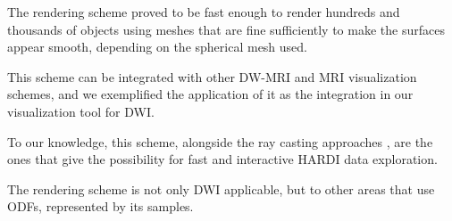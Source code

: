 \documentclass[twoside,twocolumn,10pt]{article}
\begin{document}
The rendering scheme proved to be fast enough to render hundreds and thousands of objects using meshes that are fine sufficiently to make the surfaces appear smooth, depending on the spherical mesh used.

This scheme can be integrated with other DW-MRI and MRI visualization schemes, and we exemplified the application of it as the integration in our visualization tool for DWI.

To our knowledge, this scheme, alongside the ray casting approaches \cite{peeters2009,almsick2011}, are the ones that give the possibility for fast and interactive HARDI data exploration.

The rendering scheme is not only DWI applicable, but to other areas that use ODFs, represented by its samples.










\end{document}
